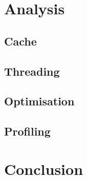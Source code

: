 \documentclass[12pt]{article}
\begin{document}
\section{Analysis}

\subsection{Cache}

\subsection{Threading}

\subsection{Optimisation}

\subsection{Profiling}

\section{Conclusion}

\newpage
\medskip


\end{document}
